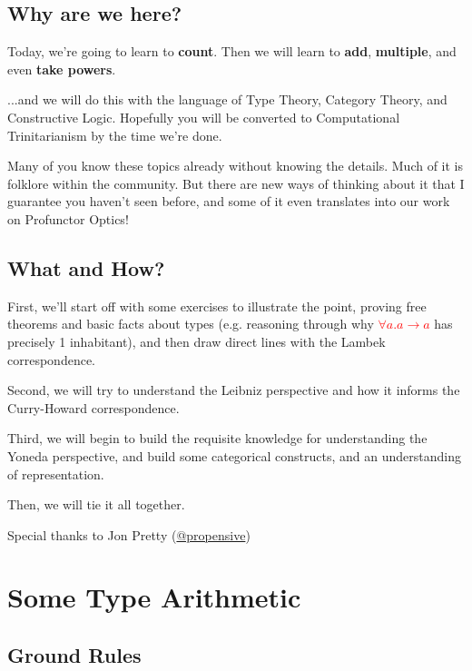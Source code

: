 \documentclass[tikz]{beamer}
\newcommand{\red}[1]{\textcolor{red}{#1}}
\theoremstyle{definition}
\begin{document}
\subsection{Why are we here?}

\frame
{ 
	Today, we're going to learn to \textbf{count}. Then we will learn to \textbf{add}, \textbf{multiple}, and even \textbf{take powers}. 
}

\frame
{ 
	...and we will do this with the language of Type Theory, Category Theory, and Constructive Logic. Hopefully you will be converted to Computational Trinitarianism by the time we're done.
}

\frame
{ 
	Many of you know these topics already without knowing the details. Much of it is folklore within the community. But there are new ways of thinking about it that I guarantee you haven't seen before, and some of it even translates into our work on Profunctor Optics! 
}

\subsection{What and How?}

\frame
{ 
	First, we'll start off with some exercises to illustrate the point, proving free theorems and basic facts about types (e.g. reasoning through why \red{$\forall a. a \to a$} has precisely 1 inhabitant), and then draw direct lines with the Lambek correspondence. 
}

\frame
{ 
	Second, we will try to understand the Leibniz perspective and how it informs the Curry-Howard correspondence. 
}

\frame
{ 
	Third, we will begin to build the requisite knowledge for understanding the Yoneda perspective, and build some categorical constructs, and an understanding of representation. 
}

\frame
{ 
	Then, we will tie it all together. 
}

\frame
{ 
	Special thanks to Jon Pretty (\href{https://twitter.com/propensive}{@propensive})
}

\section{Some Type Arithmetic}

\subsection{Ground Rules}
\end{document}
